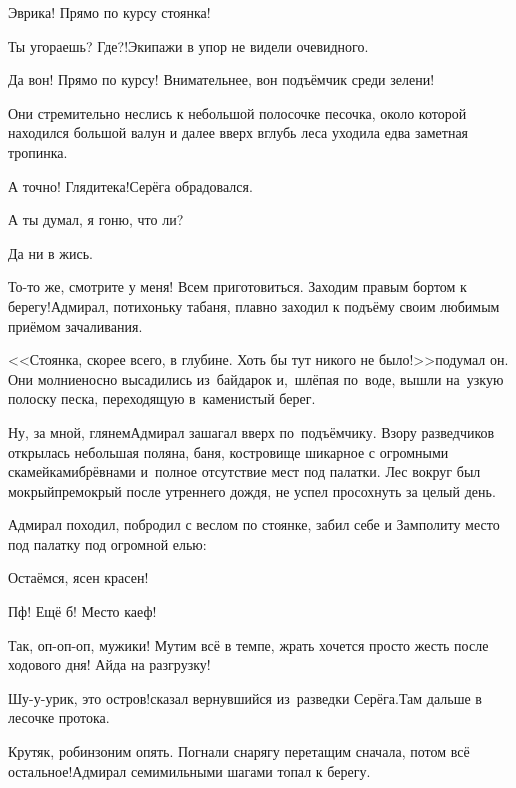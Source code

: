 \diagdash Эврика! Прямо по курсу стоянка!

\diagdash Ты угораешь? Где?!\mdash Экипажи в упор не видели очевидного.

\diagdash Да вон! Прямо по курсу! Внимательнее, вон подъёмчик среди зелени!

Они стремительно неслись к небольшой полосочке песочка, около которой находился большой валун и далее вверх вглубь леса уходила едва заметная тропинка.

\diagdash А точно! Глядите\sdash ка!\mdash Серёга обрадовался.

\diagdash А ты думал, я гоню, что ли?

\diagdash Да ни в жись.

\diagdash То-то же, смотрите у меня! Всем приготовиться. Заходим правым бортом к берегу!\mdash Адмирал, потихоньку табаня, плавно заходил к подъёму своим любимым приёмом зачаливания.


<<Стоянка, скорее всего, в глубине. Хоть бы тут никого не было!>>\mdash подумал он. Они молниеносно высадились из~байдарок и,~шлёпая по~воде, вышли на~узкую полоску песка, переходящую в~каменистый берег.

\diagdash Ну, за мной, глянем\myldots{}\mdash Адмирал зашагал вверх по~подъёмчику. Взору разведчиков открылась небольшая поляна, баня, костровище шикарное с огромными скамейками\sdash брёвнами и~полное отсутствие мест под палатки. Лес вокруг был мокрый\sdash премокрый после утреннего дождя, не успел просохнуть за целый день.

Адмирал походил, побродил с веслом по стоянке, забил себе и Замполиту место под палатку под огромной елью:

\diagdash Остаёмся, ясен красен!

\diagdash Пф! Ещё б! Место каеф!


\diagdash Так, оп-оп-оп, мужики! Мутим всё в темпе, жрать хочется просто жесть после ходового дня! Айда на разгрузку!

\diagdash Шу-у-урик, это остров!\mdash сказал вернувшийся из~разведки Серёга.\mdash Там дальше в лесочке протока.

\diagdash Крутяк, робинзоним опять. Погнали снарягу перетащим сначала, потом всё остальное!\mdash Адмирал семимильными шагами топал к берегу.

